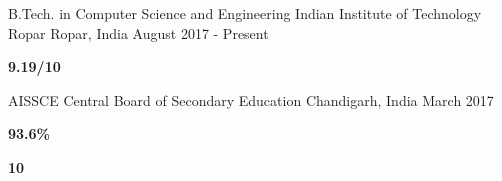 

\begin{cventries}

  \cventry
    {B.Tech. in Computer Science and Engineering} %
    {Indian Institute of Technology Ropar} %
    {Ropar, India} %
    {August 2017 - Present} %
    {
      \setlength\multicolsep{-12pt}
      \begin{multicols}{2}
      \begin{cvschool} %
        \item[] \textbf{9.19/10}
      \end{cvschool}
      \end{multicols}
    }


\cvedu
    {AISSCE} %
    {Central Board of Secondary Education} %
    {Chandigarh, India} %
    {March 2017} %
    {
      \setlength\multicolsep{-10pt}
      \begin{multicols}{2}
      \begin{cvschool} %
        \item[] \textbf{93.6\%}
        \item[]  \textbf{10}
      \end{cvschool}
      \end{multicols}
    }


\end{cventries}
